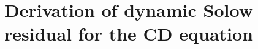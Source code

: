 \documentclass[preprint,authoryear,12pt]{elsarticle}\usepackage[]{graphicx}\usepackage[]{color}
\begin{document}








\appendix


\section{Derivation of dynamic Solow residual for the CD equation}
\label{sec:dynamic_sr_CD}
\end{document}
